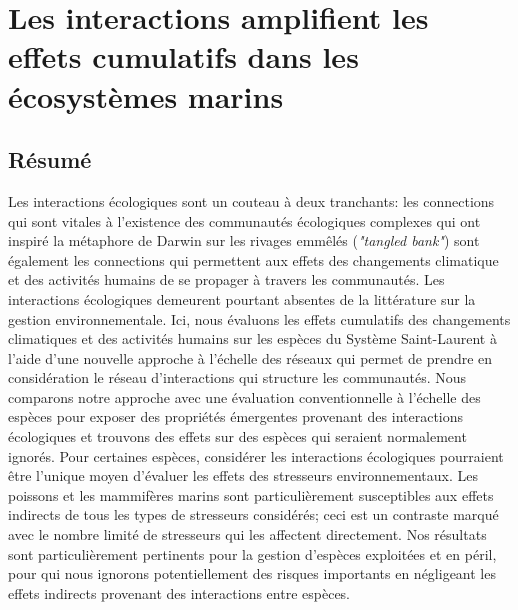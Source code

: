 \chapter{Les interactions amplifient les effets cumulatifs dans les écosystèmes marins}
\label{chap5}

\section{Résumé}

Les interactions écologiques sont un couteau à deux tranchants: les connections qui sont vitales à l’existence des communautés écologiques complexes qui ont inspiré la métaphore de Darwin sur les rivages emmêlés (\textit{"tangled bank"}) sont également les connections qui permettent aux effets des changements climatique et des activités humains de se propager à travers les communautés. Les interactions écologiques demeurent pourtant absentes de la littérature sur la gestion environnementale. Ici, nous évaluons les effets cumulatifs des changements climatiques et des activités humains sur les espèces du Système Saint-Laurent à l’aide d’une nouvelle approche à l’échelle des réseaux qui permet de prendre en considération le réseau d’interactions qui structure les communautés. Nous comparons notre approche avec une évaluation conventionnelle à l’échelle des espèces pour exposer des propriétés émergentes provenant des interactions écologiques et trouvons des effets sur des espèces qui seraient normalement ignorés. Pour certaines espèces, considérer les interactions écologiques pourraient être l’unique moyen d’évaluer les effets des stresseurs environnementaux. Les poissons et les mammifères marins sont particulièrement susceptibles aux effets indirects de tous les types de stresseurs considérés; ceci est un contraste marqué avec le nombre limité de stresseurs qui les affectent directement. Nos résultats sont particulièrement pertinents pour la gestion d’espèces exploitées et en péril, pour qui nous ignorons potentiellement des risques importants en négligeant les effets indirects provenant des interactions entre espèces.

